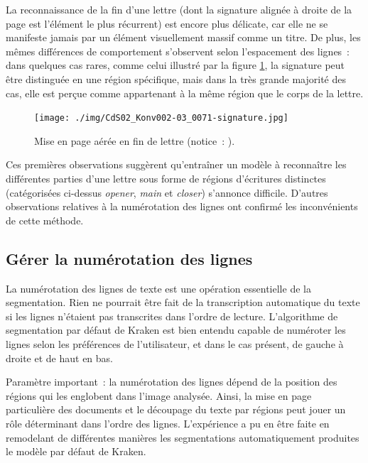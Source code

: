 \documentclass[a4paper,12pt,twoside]{book}
\begin{document}
				La reconnaissance de la fin d'une lettre (dont la signature alignée à droite de la page est l'élément le plus récurrent) est encore plus délicate, car elle ne se manifeste jamais par un élément visuellement massif comme un titre. De plus, les mêmes différences de comportement s'observent selon l'espacement des lignes~: dans quelques cas rares, comme celui illustré par la figure \ref{seg-signaure-71}, la signature peut être distinguée en une région spécifique, mais dans la très grande majorité des cas, elle est perçue comme appartenant à la même région que le corps de la lettre.
				
				\begin{figure}[!h]
					\centering
					\texttt{[image: ./img/CdS02\_Konv002-03\_0071-signature.jpg]}%
					\caption{Mise en page aérée en fin de lettre (notice~: \cite{CdS02070071}).}%
					\label{seg-signaure-71}%
				\end{figure}
				
				Ces premières observations suggèrent qu'entraîner un modèle à reconnaître les différentes parties d'une lettre sous forme de régions d'écritures distinctes (catégorisées ci-dessus \textit{opener}, \textit{main} et \textit{closer}) s'annonce difficile. D'autres observations relatives à la numérotation des lignes ont confirmé les inconvénients de cette méthode.
				
			\subsection{Gérer la numérotation des lignes}
				La numérotation des lignes de texte est une opération essentielle de la {segmentation}. Rien ne pourrait être fait de la transcription automatique du texte si les lignes n'étaient pas transcrites dans l'ordre de lecture. L'algorithme de {segmentation} par défaut de Kraken est bien entendu capable de numéroter les lignes selon les préférences de l'utilisateur, et dans le cas présent, de gauche à droite et de haut en bas.
				
				Paramètre important~: la numérotation des lignes dépend de la position des régions qui les englobent dans l'image analysée. Ainsi, la mise en page particulière des documents et le découpage du texte par régions peut jouer un rôle déterminant dans l'ordre des lignes. L'expérience a pu en être faite en remodelant de différentes manières les {segmentation}s automatiquement produites le modèle par défaut de Kraken.
				
\end{document}
